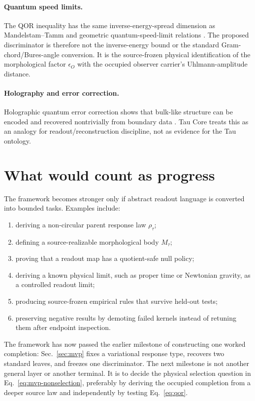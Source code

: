 \documentclass[11pt]{article}
\newcommand{\Rmap}{\rho_{\tau}}
\newcommand{\Mta}{M_{\tau}}
\begin{document}
\paragraph{Quantum speed limits.}
The QOR inequality has the same inverse-energy-spread dimension as
Mandelstam--Tamm and geometric quantum-speed-limit relations
\cite{MandelstamTamm1945,AnandanAharonov1990,Taddei2013}.  The proposed
discriminator is therefore not the inverse-energy bound or the standard
Gram-chord/Bures-angle conversion.  It is the source-frozen physical
identification of the morphological factor \(\epsilon_O\) with the occupied
observer carrier's Uhlmann-amplitude distance.

\paragraph{Holography and error correction.}
Holographic quantum error correction shows that bulk-like structure can be
encoded and recovered nontrivially from boundary data
\cite{AlmheiriDongHarlow2015}.  Tau Core treats this as an analogy for
readout/reconstruction discipline, not as evidence for the Tau ontology.

\section{What would count as progress}

The framework becomes stronger only if abstract readout language is converted
into bounded tasks.  Examples include:
\begin{enumerate}[label=(\arabic*)]
  \item deriving a non-circular parent response law \(\Rmap\);
  \item defining a source-realizable morphological body \(\Mta\);
  \item proving that a readout map has a quotient-safe null policy;
  \item deriving a known physical limit, such as proper time or Newtonian
  gravity, as a controlled readout limit;
  \item producing source-frozen empirical rules that survive held-out tests;
  \item preserving negative results by demoting failed kernels instead of
  retuning them after endpoint inspection.
\end{enumerate}

The framework has now passed the earlier milestone of constructing one worked
completion: Sec.~\ref{sec:mvp} fixes a variational response type, recovers two
standard leaves, and freezes one discriminator.  The next milestone is not
another general layer or another terminal.  It is to decide the physical
selection question in Eq.~\eqref{eq:mvp-nonselection}, preferably by deriving
the occupied completion from a deeper source law and independently by testing
Eq.~\eqref{eq:qor}.
\end{document}
